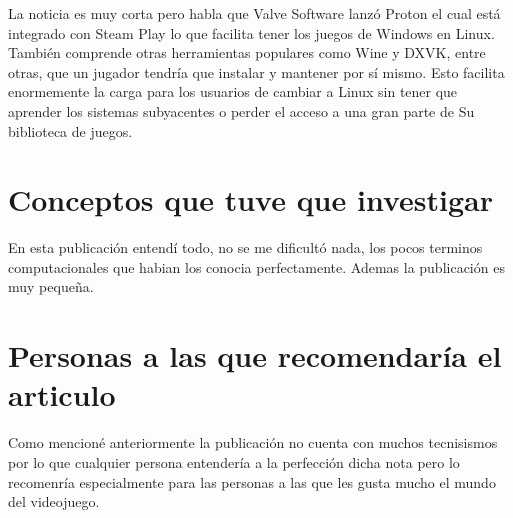 \documentclass[11pt, a4paper]{report}
\begin{document}
La noticia es muy corta pero habla que Valve Software lanzó Proton el cual está
integrado con Steam Play lo que facilita tener los juegos de Windows en Linux.
También comprende otras herramientas populares como Wine y DXVK, entre otras,
que un jugador tendría que instalar y mantener por sí mismo. Esto facilita
enormemente la carga para los usuarios de cambiar a Linux sin tener que
aprender los sistemas subyacentes o perder el acceso a una gran parte de Su
biblioteca de juegos. 

\section*{Conceptos que tuve que investigar}
En esta publicación entendí todo, no se me dificultó nada, los pocos terminos
computacionales que habian los conocia perfectamente. Ademas la publicación es
muy pequeña.


\section*{Personas a las que recomendaría el articulo}

Como mencioné anteriormente la publicación no cuenta con muchos tecnisismos por
lo que cualquier persona entendería a la perfección dicha nota pero lo
recomenría especialmente para las personas a las que les gusta mucho el mundo
del videojuego.
\end{document}
